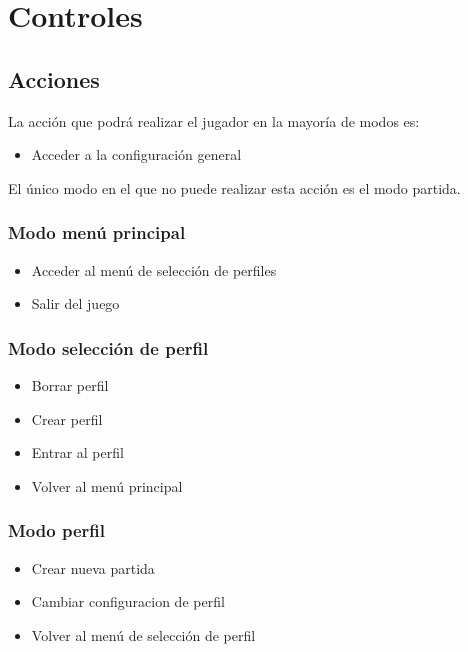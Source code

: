 \section{Controles} %


\subsection{Acciones}


La acción que podrá realizar el jugador en la mayoría de modos es:
\begin{itemize}
    \item Acceder a la configuración general
\end{itemize}
El único modo en el que no puede realizar esta acción es el modo partida.

\subsubsection{Modo menú principal}
\begin{itemize}
    \item Acceder al menú de selección de perfiles
    \item Salir del juego
\end{itemize}

\subsubsection{Modo selección de perfil}
\begin{itemize}
    \item Borrar perfil
    \item Crear perfil
    \item Entrar al perfil
    \item Volver al menú principal
\end{itemize}

\subsubsection{Modo perfil}
\begin{itemize}
    \item Crear nueva partida
    \item Cambiar configuracion de perfil
    \item Volver al menú de selección de perfil
\end{itemize}

